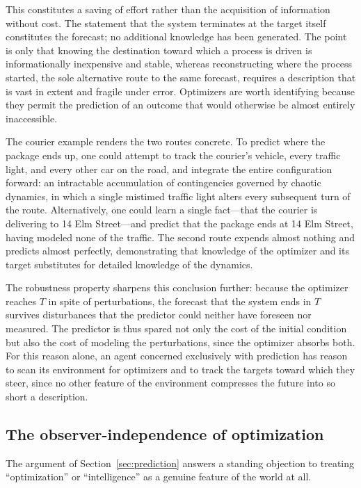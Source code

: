 \documentclass[11pt]{article}
\begin{document}
This constitutes a saving of effort rather than the acquisition of information without cost. The statement that the system terminates at the target itself constitutes the forecast; no additional knowledge has been generated. The point is only that knowing the destination toward which a process is driven is informationally inexpensive and stable, whereas reconstructing where the process started, the sole alternative route to the same forecast, requires a description that is vast in extent and fragile under error. Optimizers are worth identifying because they permit the prediction of an outcome that would otherwise be almost entirely inaccessible.

The courier example renders the two routes concrete. To predict where the package ends up, one could attempt to track the courier's vehicle, every traffic light, and every other car on the road, and integrate the entire configuration forward: an intractable accumulation of contingencies governed by chaotic dynamics, in which a single mistimed traffic light alters every subsequent turn of the route. Alternatively, one could learn a single fact---that the courier is delivering to 14 Elm Street---and predict that the package ends at 14 Elm Street, having modeled none of the traffic. The second route expends almost nothing and predicts almost perfectly, demonstrating that knowledge of the optimizer and its target substitutes for detailed knowledge of the dynamics.

The robustness property sharpens this conclusion further: because the optimizer reaches $T$ in spite of perturbations, the forecast that the system ends in $T$ survives disturbances that the predictor could neither have foreseen nor measured. The predictor is thus spared not only the cost of the initial condition but also the cost of modeling the perturbations, since the optimizer absorbs both. For this reason alone, an agent concerned exclusively with prediction has reason to scan its environment for optimizers and to track the targets toward which they steer, since no other feature of the environment compresses the future into so short a description.

\subsection{The observer-independence of optimization}
\label{sec:objective}

The argument of Section~\ref{sec:prediction} answers a standing objection to treating ``optimization'' or ``intelligence'' as a genuine feature of the world at all.
\end{document}
